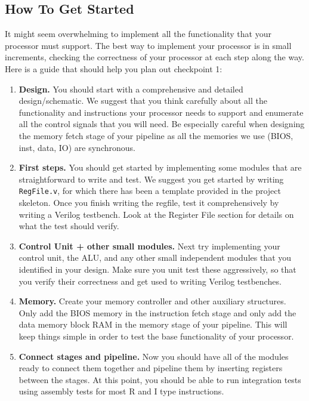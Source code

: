 \documentclass[11pt]{article}
\begin{document}
\subsection{How To Get Started}
It might seem overwhelming to implement all the functionality that your processor must support. The best way to implement your processor is in small increments, checking the correctness of your processor at each step along the way. Here is a guide that should help you plan out checkpoint 1:

\begin{enumerate}
	\item \textbf{Design.} You should start with a comprehensive and detailed design/schematic. We suggest that you think carefully about all the functionality and instructions your processor needs to support and enumerate all the control signals that you will need. Be especially careful when designing the memory fetch stage of your pipeline as all the memories we use (BIOS, inst, data, IO) are synchronous.
	
	\item \textbf{First steps.} You should get started by implementing some modules that are straightforward to write and test. We suggest you get started by writing \verb|RegFile.v|, for which there has been a template provided in the project skeleton. Once you finish writing the regfile, test it comprehensively by writing a Verilog testbench. Look at the Register File section for details on what the test should verify.
	
	\item \textbf{Control Unit + other small modules.} Next try implementing your control unit, the ALU, and any other small independent modules that you identified in your design. Make sure you unit test these aggressively, so that you verify their correctness and get used to writing Verilog testbenches.
	
	\item \textbf{Memory.} Create your memory controller and other auxiliary structures. Only add the BIOS memory in the instruction fetch stage and only add the data memory block RAM in the memory stage of your pipeline. This will keep things simple in order to test the base functionality of your processor.
	
	\item \textbf{Connect stages and pipeline.} Now you should have all of the modules ready to connect them together and pipeline them by inserting registers between the stages. At this point, you should be able to run integration tests using assembly tests for most R and I type instructions.
	

\end{enumerate}
\end{document}
